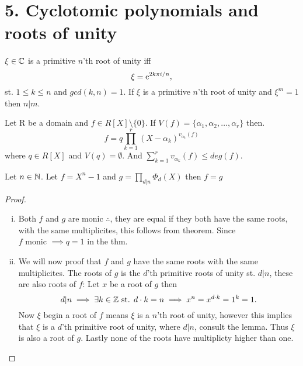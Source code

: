 \chapter*{5. Cyclotomic polynomials and roots of unity}
\begin{lemma}
  $\xi \in \mathbb{C}$ is a primitive $n$'th root of unity iff
  \begin{equation*}
    \xi = \mathrm{e}^{2 k\pi i / n},
  \end{equation*}
  st. $1 \leq k \leq n$ and $gcd(k, n) = 1$. If $\xi$ is a primitive $n$'th root of unity and $\xi^{m} = 1$ then $n | m$.
\end{lemma}

\begin{theorem}
  Let R be a domain and $f \in R[X]\setminus \{0\}.$ If $V(f) = \{\alpha_{1}, \alpha_{2}, \ldots, \alpha_{r}\}$ then.
  \begin{equation*}
    f = q \prod_{k = 1}^{r} (X - \alpha_{k})^{v_{\alpha_{k}}(f)}
  \end{equation*}
  where $q \in R[X]$ and $V(q) = \emptyset$. And $\sum^{r}_{k = 1} v_{\alpha_{k}}(f) \leq deg(f)$.
\end{theorem}

\begin{proposition}
  Let $n \in \mathbb{N}$. Let $f = X^{n} - 1$ and $g = \displaystyle\prod_{d | n} \Phi_{d}(X)$ then $f = g$
\end{proposition}
\begin{proof}\
  \begin{enumerate}[i)]
    \item Both $f$ and $g$ are monic $\therefore$, they are equal if they both have the same roots, with the same multiplicites, this follows from theorem. Since $f \text{ monic }\implies q = 1$ in the thm.
    \item We will now proof that $f$ and $g$ have the same roots with the same multiplicites. The roots of $g$ is the $d$'th primitive roots of unity st. $d | n$, these are also roots of $f$: Let $x$ be a root of $g$ then
    \begin{equation*}
      d | n \implies \exists k \in \mathbb{Z} \text{ st. } d\cdot k = n \implies x^{n} = x^{d \cdot k} = 1^{k} = 1.
    \end{equation*}
    Now $\xi$ begin a root of $f$ means $\xi$ is a $n$'th root of unity, however this implies that $\xi$ is a $d$'th primitive root of unity, where $d | n$, consult the lemma. Thus $\xi$ is also a root of $g$. Lastly none of the roots have multiplicty higher than one.
  \end{enumerate}
\end{proof}
